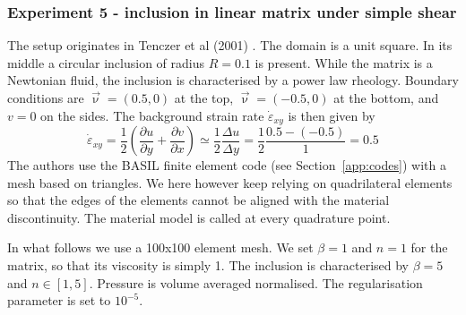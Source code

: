 \newpage
\subsubsection*{Experiment 5 - inclusion in linear matrix under simple shear}

The setup originates in Tenczer et al (2001) \cite{tesb01}. 
The domain is a unit square. In its middle a circular inclusion of radius $R=0.1$
is present. While the matrix is a Newtonian fluid, the inclusion is characterised
by a power law rheology. 
Boundary conditions are $\vec\upnu=(0.5,0)$ at the top, $\vec\upnu=(-0.5,0)$
at the bottom, and $v=0$ on the sides.
The background strain rate $\dot\varepsilon_{xy}$ is then given by
\[
\dot\varepsilon_{xy} = \frac{1}{2}\left( \frac{\partial u}{\partial y}+ \frac{\partial v}{\partial x} \right)
\simeq \frac{1}{2} \frac{\Delta u}{\Delta y}
= \frac{1}{2} \frac{0.5-(-0.5)}{1} = 0.5
\]
The authors use the BASIL finite element code (see Section~\ref{app:codes})
with a mesh based on triangles. We here however 
keep relying on quadrilateral elements so that the edges of the elements cannot be 
aligned with the material discontinuity. 
The material model is called at every quadrature point.  

In what follows we use a 100x100 element mesh. We set $\beta=1$ and $n=1$ for the matrix, so that its 
viscosity is simply 1. The inclusion is characterised by $\beta=5$ and $n\in[1,5]$.
Pressure is volume averaged normalised. The regularisation parameter is set to $10^{-5}$. 

